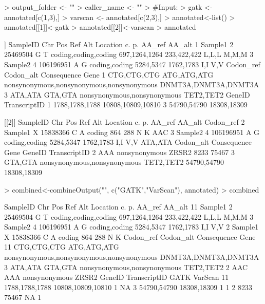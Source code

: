 \documentclass{article}
\begin{document}
\begin{Schunk}
\begin{Sinput}
> output_folder <- ""
> caller_name <- ""
> #Input:
> gatk <- annotated[c(1,3),]
> varscan <- annotated[c(2,3),]
> annotated<-list()
> annotated[[1]]<-gatk
> annotated[[2]]<-varscan
> annotated
\end{Sinput}
\begin{Soutput}
[[1]]
  SampleID Chr       Pos Ref Alt             Location            c.          p. AA_ref AA_alt
1  Sample1   2  25469504   G   T coding,coding,coding 697,1264,1264 233,422,422  L,L,L  M,M,M
3  Sample2   4 106196951   A   G        coding,coding     5284,5347   1762,1783    I,I    V,V
    Codon_ref   Codon_alt                               Consequence                 Gene
1 CTG,CTG,CTG ATG,ATG,ATG nonsynonymous,nonsynonymous,nonsynonymous DNMT3A,DNMT3A,DNMT3A
3     ATA,ATA     GTA,GTA               nonsynonymous,nonsynonymous            TET2,TET2
          GeneID      TranscriptID
1 1788,1788,1788 10808,10809,10810
3    54790,54790       18308,18309

[[2]]
  SampleID Chr       Pos Ref Alt      Location        c.        p. AA_ref AA_alt Codon_ref
2  Sample1   X  15838366   C   A        coding       864       288      N      K       AAC
3  Sample2   4 106196951   A   G coding,coding 5284,5347 1762,1783    I,I    V,V   ATA,ATA
  Codon_alt                 Consequence      Gene      GeneID TranscriptID
2       AAA               nonsynonymous     ZRSR2        8233        75467
3   GTA,GTA nonsynonymous,nonsynonymous TET2,TET2 54790,54790  18308,18309
\end{Soutput}
\begin{Sinput}
> combined<-combineOutput("", c("GATK","VarScan"), annotated)
> combined
\end{Sinput}
\begin{Soutput}
   SampleID Chr       Pos Ref Alt             Location            c.          p. AA_ref AA_alt
11  Sample1   2  25469504   G   T coding,coding,coding 697,1264,1264 233,422,422  L,L,L  M,M,M
3   Sample2   4 106196951   A   G        coding,coding     5284,5347   1762,1783    I,I    V,V
2   Sample1   X  15838366   C   A               coding           864         288      N      K
     Codon_ref   Codon_alt                               Consequence                 Gene
11 CTG,CTG,CTG ATG,ATG,ATG nonsynonymous,nonsynonymous,nonsynonymous DNMT3A,DNMT3A,DNMT3A
3      ATA,ATA     GTA,GTA               nonsynonymous,nonsynonymous            TET2,TET2
2          AAC         AAA                             nonsynonymous                ZRSR2
           GeneID      TranscriptID GATK VarScan
11 1788,1788,1788 10808,10809,10810    1      NA
3     54790,54790       18308,18309    1       1
2            8233             75467   NA       1
\end{Soutput}
\end{Schunk}
\end{document}
